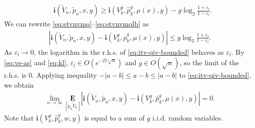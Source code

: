 \documentclass[journal, twocol]{IEEEtran}
\newcommand{\bfi}{{\mathbf{i}}}
\newcommand{\tp}{{\widetilde{p}}}
\newcommand{\hp}{{\hat{p}}}
\newcommand{\bfE}{{\mathbf{E}}}
\newcommand{\tV}{{\widetilde{V}}}
\newcommand{\abs}[1]{\left|{#1}\right|}
\newcommand{\ve}{\varepsilon}
\newcommand{\bi}{\mathbf{i}}
\newcommand{\pW}[2]{[{#1}{#2}]}
\begin{document}
\begin{align}
&\bi(\tV_n,\tp_n,x,y)
\geq \bi(V^g_k,\hp_k^g,\mu(x),y)-g\log_2 \frac{1+\ve_l}{1-\ve_l}.
\label{eq:etvnvmqlb}
\end{align}
We can rewrite \eqref{eq:etvnvmq}--\eqref{eq:etvnvmqlb} as
\begin{align}
\abs{\bi(\tV_n,\tp_n,x,y)\!-\!\bi(V^g_k,\hp_k^g,\mu(x),y)}\! \leq\! g\log_2 \frac{1+\ve_l}{1-\ve_l}.
\label{eq:itv-qiv-bounded}
\end{align}
As $\ve_l\to 0$, the logarithm in the r.h.s. of \eqref{eq:itv-qiv-bounded} behaves as $\ve_l$.
By \eqref{eq:ve-as} and \eqref{eq:kl}, $\ve_l\in O(e^{-D\sqrt[4]{n}})$ and $g\in O(\sqrt{n})$, so the limit of the r.h.s. is $0$.
Applying inequality $-|a-b|\leq a-b \leq |a-b|$ to \eqref{eq:itv-qiv-bounded}, we obtain
\begin{align}
\lim_{n\to\infty}
\underset{\pW{\tp_n}{\tV_n}}{\bfE}
\abs{
\bi(\tV_n,\tp_n,x,y)
-
\bi(V^g_k,\hp_k^g,\mu(x),y)
}
=0.
\label{eq:eitv-eq-eiqv}
\end{align}
Note that $\bfi(V^g_k, \hp_k^g, w, y)$ is equal to a sum of $g$ i.i.d. random variables.
\end{document}

